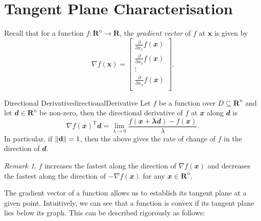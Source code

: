 \documentclass[math, code]{amznotes}
\theoremstyle{remark}
\newtheorem*{remark}{Remark}
\begin{document}
\section{Tangent Plane Characterisation}
Recall that for a function $f \colon \mathbf{R}^n \to \mathbf{R}$, the \textit{gradient vector} of $f$ at $\mathbf{x}$ is given by
\begin{equation*}
    \nabla f(\mathbf{x}) = \begin{bmatrix}
        \frac{\partial}{\partial x_1}f(\mathbfit{x}) \\
        \frac{\partial}{\partial x_2}f(\mathbfit{x}) \\
        \vdots \\
        \frac{\partial}{\partial x_n}f(\mathbfit{x}) \\
    \end{bmatrix}.
\end{equation*}
\begin{probox}{Directional Derivative}{directionalDerivative}
    Let $f$ be a function over $D \subseteq \mathbf{R}^n$ and let $\mathbfit{d} \in \mathbf{R}^n$ be non-zero, then the directional derivative of $f$ at $\mathbfit{x}$ along $\mathbfit{d}$ is
    \begin{equation*}
        \nabla f(\mathbfit{x})^{\mathrm{T}}\mathbfit{d} = \lim_{\lambda \to 0}\frac{f(\mathbfit{x + \lambda\mathbfit{d}}) - f(\mathbfit{x})}{\lambda}.
    \end{equation*}
    In particular, if ${\left\lVert {\mathbf{d}} \right\rVert} = 1$, then the above gives the rate of change of $f$ in the direction of $\mathbfit{d}$.
\end{probox}
\begin{notebox}
    \begin{remark}
        $f$ increases the fastest along the direction of $\nabla f(\mathbfit{x})$ and decreases the fastest along the direction of $-\nabla f(\mathbfit{x})$ for any $\mathbfit{x} \in \mathbf{R}^n$.
    \end{remark}
\end{notebox}
The gradient vector of a function allows us to establish its tangent plane at a given point. Intuitively, we can see that a function is convex if its tangent plane lies below its graph. This can be described rigorously as follows:
\end{document}
